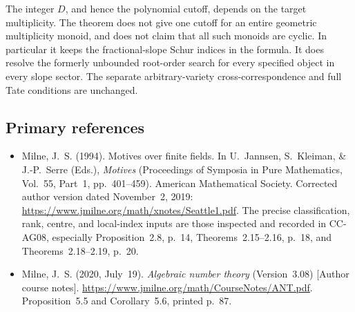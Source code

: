 The integer \(D\), and hence the polynomial cutoff,
depends on the target multiplicity.  The theorem
does not give one cutoff for an entire geometric
multiplicity monoid, and does not claim that all
such monoids are cyclic.  In particular it keeps
the fractional-slope Schur indices in the formula.
It does resolve the formerly unbounded root-order
search for every specified object in every slope
sector.  The separate arbitrary-variety
cross-correspondence and full Tate conditions
are unchanged.

\subsection{Primary references}

\begin{itemize}
\item Milne, J.~S. (1994). Motives over finite fields.
In U.~Jannsen, S.~Kleiman, \& J.-P.~Serre (Eds.),
\emph{Motives} (Proceedings of Symposia in Pure
Mathematics, Vol.~55, Part~1, pp.~401--459).
American Mathematical Society.
Corrected author version dated November~2, 2019:
\url{https://www.jmilne.org/math/xnotes/Seattle1.pdf}.
The precise classification, rank, centre, and
local-index inputs are those inspected and
recorded in CC-AG08, especially Proposition~2.8,
p.~14, Theorems~2.15--2.16, p.~18, and
Theorems~2.18--2.19, p.~20.
\item Milne, J.~S. (2020, July~19).
\emph{Algebraic number theory} (Version~3.08)
[Author course notes].
\url{https://www.jmilne.org/math/CourseNotes/ANT.pdf}.
Proposition~5.5 and Corollary~5.6, printed p.~87.
\end{itemize}
